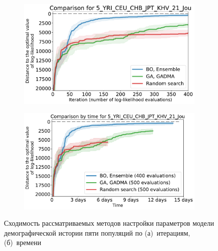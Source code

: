 \begin{figure}[ht]
    \centering
    \centering
    \begin{subfigure}[b]{0.49\linewidth}
        \centering
        \includegraphics[width=\textwidth]{images_experiments/bo_ga/5_YRI_CEU_CHB_JPT_KHV_21_Jou_bo_ga.pdf}
        \caption{}
        \label{fig:bo_ga_comp_5pops:iteration}
    \end{subfigure}%
    \begin{subfigure}[b]{0.49\linewidth}
        \centering
        \includegraphics[width=\textwidth]{images_experiments/bo_ga/5_YRI_CEU_CHB_JPT_KHV_21_Jou_bo_ga_time.pdf}
        \caption{}
        \label{fig:bo_ga_comp_5pops:time}
    \end{subfigure}
    \caption{Сходимость рассматриваемых методов настройки параметров модели демографической истории пяти популяций по (а)~итерациям, (б)~времени}
    \label{fig:bo_ga_comp_5pops}
\end{figure}

